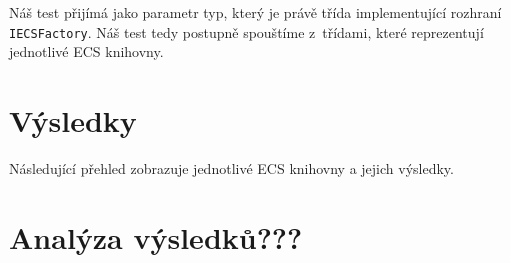 Náš test přijímá jako parametr typ, který je právě třída implementující rozhraní \texttt{IECSFactory}. Náš test tedy postupně spouštíme z~třídami, které reprezentují jednotlivé ECS knihovny.

\section{Výsledky}
Následující přehled zobrazuje jednotlivé ECS knihovny a jejich výsledky.


\section{Analýza výsledků???}

















